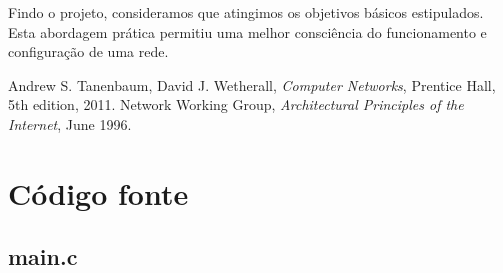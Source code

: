 \documentclass[a4paper,11pt,titlepage]{article}
\begin{document}
Findo o projeto, consideramos que atingimos os objetivos básicos estipulados. Esta
abordagem prática permitiu uma melhor consciência do funcionamento e configuração de uma rede.

\begin{thebibliography}{9}
  Andrew S. Tanenbaum,
  David J. Wetherall,
  \emph{Computer Networks},
  Prentice Hall, 
  5th edition,
  2011.
  Network Working Group,
  \emph{Architectural Principles of the Internet},
  June 1996.
\end{thebibliography}

\appendix
\section{Código fonte}
\subsection*{main.c}
\end{document}
